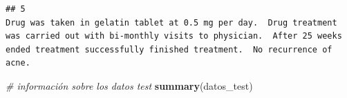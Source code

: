 \documentclass[spanish,]{article}
\newenvironment{Shaded}{\begin{snugshade}}{\end{snugshade}}
\newcommand{\CommentTok}[1]{\textcolor[rgb]{0.56,0.35,0.01}{\textit{#1}}}
\newcommand{\KeywordTok}[1]{\textcolor[rgb]{0.13,0.29,0.53}{\textbf{#1}}}
\newcommand{\NormalTok}[1]{#1}
\begin{document}
\begin{verbatim}
## 5                                                                                                                                                                                                                                                                                                                                                                                                                                                                                                                                                                                                                                                                                                                                                                                                                                                                                                                                                                                                                                 Drug was taken in gelatin tablet at 0.5 mg per day.  Drug treatment was carried out with bi-monthly visits to physician.  After 25 weeks ended treatment successfully finished treatment.  No recurrence of acne.
\end{verbatim}

\begin{Shaded}
\begin{Highlighting}[]
\CommentTok{# información sobre los datos test}
\KeywordTok{summary}\NormalTok{(datos_test) }
\end{Highlighting}
\end{Shaded}
\end{document}
